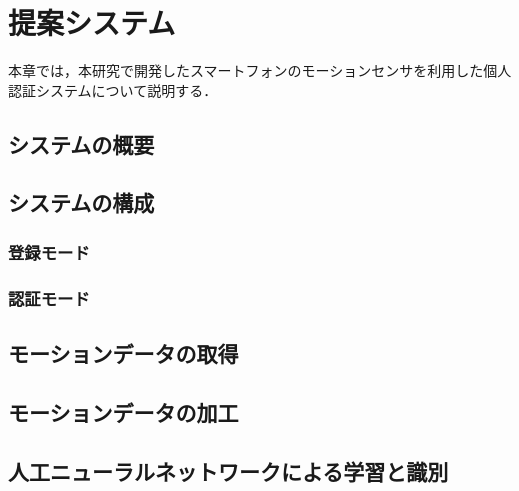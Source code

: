 \chapter{提案システム}
本章では，本研究で開発したスマートフォンのモーションセンサを利用した個人認証システムについて説明する．

\section{システムの概要}

\section{システムの構成}

\subsection{登録モード}

\subsection{認証モード}

\section{モーションデータの取得}

\section{モーションデータの加工}

\section{人工ニューラルネットワークによる学習と識別}
